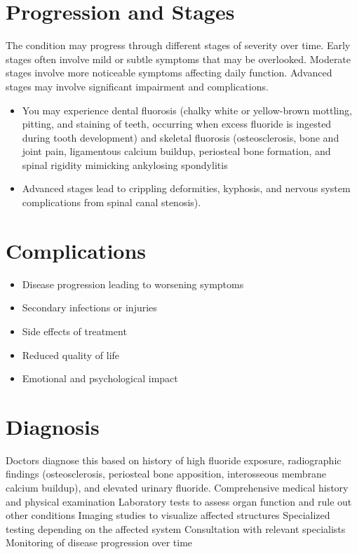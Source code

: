 \section{Progression and Stages}
The condition may progress through different stages of severity over time. Early stages often involve mild or subtle symptoms that may be overlooked. Moderate stages involve more noticeable symptoms affecting daily function. Advanced stages may involve significant impairment and complications.

\begin{itemize}[noitemsep]
  \item You may experience dental fluorosis (chalky white or yellow-brown mottling, pitting, and staining of teeth, occurring when excess fluoride is ingested during tooth development) and skeletal fluorosis (osteosclerosis, bone and joint pain, ligamentous calcium buildup, periosteal bone formation, and spinal rigidity mimicking ankylosing spondylitis
  \item Advanced stages lead to crippling deformities, kyphosis, and nervous system complications from spinal canal stenosis).
\end{itemize}
\section{Complications}
\begin{itemize}[noitemsep]
  \item Disease progression leading to worsening symptoms
  \item Secondary infections or injuries
  \item Side effects of treatment
  \item Reduced quality of life
  \item Emotional and psychological impact
\end{itemize}
\section{Diagnosis}
Doctors diagnose this based on history of high fluoride exposure, radiographic findings (osteosclerosis, periosteal bone apposition, interosseous membrane calcium buildup), and elevated urinary fluoride. Comprehensive medical history and physical examination Laboratory tests to assess organ function and rule out other conditions Imaging studies to visualize affected structures Specialized testing depending on the affected system Consultation with relevant specialists Monitoring of disease progression over time

